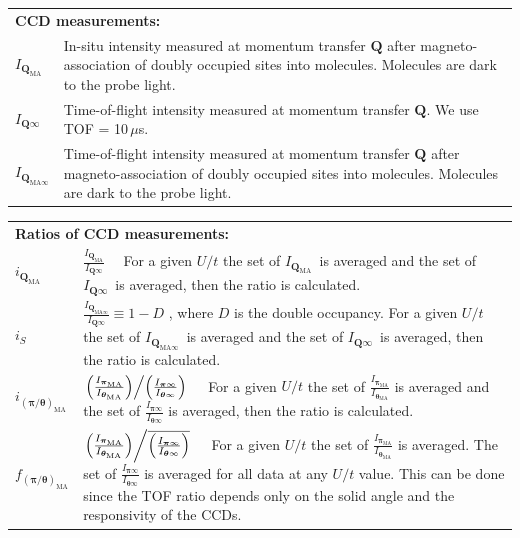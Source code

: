 \documentclass[11pt,letter]{article}
\newcommand{\bv}[1]{\ensuremath{\bm{#1}}}
\newcommand{\Iqtof}{\ensuremath{I_{\bv{Q}\infty} }}
\newcommand{\Itof}[1]{\ensuremath{I_{\bv{#1}\infty} }}
\newcommand{\Iq}{\ensuremath{I_{\bv{Q}} }}
\newcommand{\iq}{\ensuremath{i_{\bv{Q}} }}
\newcommand{\Iqma}{\ensuremath{I_{\bv{Q}_{\text{MA}}} }}
\newcommand{\Ima}[1]{\ensuremath{I_{\bv{#1}_{\text{MA}}} }}
\newcommand{\iqma}{\ensuremath{i_{\bv{Q}_{\text{MA}}} }}
\newcommand{\jqma}{\ensuremath{j_{\bv{Q}_{\text{MA}}} }}
\newcommand{\Iqmatof}{\ensuremath{I_{\bv{Q}_{\text{MA}\infty}} }}
\newcommand{\is}{\ensuremath{i_{S}} }
\newcommand{\ima}[1]{\ensuremath{i_{\bv{#1}_{\text{MA}}} }}
\newcommand{\fma}[1]{\ensuremath{f_{\bv{#1}_{\text{MA}}} }}
\begin{document}
\renewcommand{\arraystretch}{1.5} 
\begin{tabular}{ l | p{15cm}  }
  \multicolumn{2}{l}{ \large \bf CCD measurements: } \\ 
  \noalign{\smallskip} 
  \Iqma  & In-situ intensity measured at momentum transfer $\bv{Q}$ after 
           magneto-association of doubly occupied sites into molecules. 
           Molecules are dark to the probe light.  
               \\ \hline
  \Iqtof & Time-of-flight intensity measured at momentum transfer $\bv{Q}$. 
           We use TOF = 10\,$\mu$s.  \\ \hline
  \Iqmatof & Time-of-flight intensity measured at momentum transfer $\bv{Q}$ after 
           magneto-association of doubly occupied sites into molecules. 
           Molecules are dark to the probe light.
\end{tabular}

\vspace{1em}

\onehalfspacing

\renewcommand{\arraystretch}{2.0} 
\begin{tabular}{ l | p{15cm}  }
  \multicolumn{2}{l}{ \large \bf Ratios of CCD measurements: } \\  
  \noalign{\smallskip} 
  $\iqma$  &  $\frac{\Iqma}{\Iqtof}$ \ \ For a given $U/t$ the set of $\Iqma$\ is 
              averaged and the set of $\Iqtof$\ is averaged, then the ratio is 
              calculated.     \\ \hline
  $\is$    &  $\frac{\Iqmatof}{\Iqtof} \equiv 1-D $ , where $D$ is
              the double occupancy.  For a given $U/t$ the set of $\Iqmatof$\
              is averaged and the set of $\Iqtof$\ is averaged, then the 
              ratio is calculated. \\ \hline
  $\ima{(\pi/\theta)}$ &   
  $\left. 
  \left( \frac{ \Ima{\pi} }{ \Ima{\theta} } \right)  \middle/  
  \left( \frac{ \Itof{\pi} }{ \Itof{\theta} } \right)  
  \right. $ \ \ For a given $U/t$ the set of
  $\frac{ \Ima{\pi} }{ \Ima{\theta} }$ is averaged and the 
  set of $\frac{ \Itof{\pi} }{ \Itof{\theta} }$ is averaged, then
  the ratio is calculated.  \\ \hline
  $\fma{(\pi/\theta)}$ &  
  $\left. 
  \left( \frac{ \Ima{\pi} }{ \Ima{\theta} } \right)  \middle/ 
  \overline{ 
  \left( \frac{ \Itof{\pi} }{ \Itof{\theta} } \right)}  
  \right. $ \ \ For a given $U/t$ the set of
  $\frac{ \Ima{\pi} }{ \Ima{\theta} }$ is averaged.  The 
  set of $\frac{ \Itof{\pi} }{ \Itof{\theta} }$ is averaged for all data
  at any $U/t$ value.  This can be done since the TOF ratio depends only on 
  the solid angle and the responsivity of the CCDs.   \\ \hline
\end{tabular}
\end{document}
